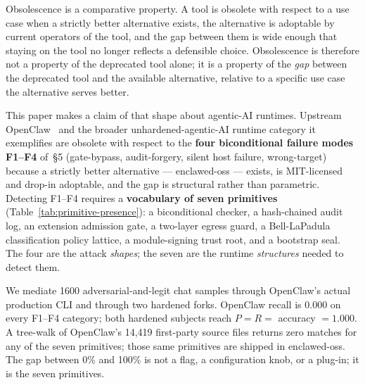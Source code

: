 \documentclass[11pt]{article}
\begin{document}
Obsolescence is a comparative property. A tool is obsolete with
respect to a use case when a strictly better alternative exists, the
alternative is adoptable by current operators of the tool, and the
gap between them is wide enough that staying on the tool no longer
reflects a defensible choice. Obsolescence is therefore not a
property of the deprecated tool alone; it is a property of the
\emph{gap} between the deprecated tool and the available alternative,
relative to a specific use case the alternative serves better.

This paper makes a claim of that shape about agentic-AI runtimes.
Upstream OpenClaw~\cite{OpenClaw} and the broader
unhardened-agentic-AI runtime category it exemplifies are obsolete
with respect to the \textbf{four biconditional failure modes
F1--F4} of \cite{Metere2026enclawed}\,§5 (gate-bypass,
audit-forgery, silent host failure, wrong-target) because a strictly
better alternative --- enclawed-oss --- exists, is MIT-licensed and
drop-in adoptable, and the gap is structural rather than parametric.
Detecting F1--F4 requires a \textbf{vocabulary of seven primitives}
(Table~\ref{tab:primitive-presence}): a biconditional checker, a
hash-chained audit log, an extension admission gate, a two-layer
egress guard, a Bell-LaPadula classification policy lattice, a
module-signing trust root, and a bootstrap seal. The four are the
attack \emph{shapes}; the seven are the runtime \emph{structures}
needed to detect them.

We mediate 1600 adversarial-and-legit chat samples through
OpenClaw's actual production CLI and through two hardened forks.
OpenClaw recall is 0.000 on every F1--F4 category; both hardened
subjects reach $P = R =$ accuracy $= 1.000$. A tree-walk of
OpenClaw's 14{,}419 first-party source files returns zero matches
for any of the seven primitives; those same primitives are shipped
in enclawed-oss. The gap between 0\% and 100\% is not a flag, a
configuration knob, or a plug-in; it is the seven primitives.
\end{document}
